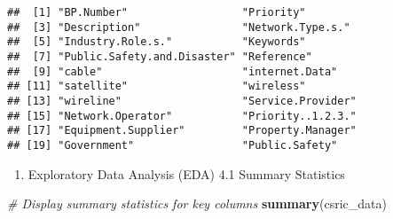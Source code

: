 \documentclass[
]{article}
\newenvironment{Shaded}{\begin{snugshade}}{\end{snugshade}}
\newcommand{\CommentTok}[1]{\textcolor[rgb]{0.56,0.35,0.01}{\textit{#1}}}
\newcommand{\FunctionTok}[1]{\textcolor[rgb]{0.13,0.29,0.53}{\textbf{#1}}}
\newcommand{\NormalTok}[1]{#1}
\newcommand{\OtherTok}[1]{\textcolor[rgb]{0.56,0.35,0.01}{#1}}
\newcommand{\SpecialCharTok}[1]{\textcolor[rgb]{0.81,0.36,0.00}{\textbf{#1}}}
\providecommand{\tightlist}{%
  \setlength{\itemsep}{0pt}\setlength{\parskip}{0pt}}
\begin{document}
\begin{verbatim}
##  [1] "BP.Number"                  "Priority"                  
##  [3] "Description"                "Network.Type.s."           
##  [5] "Industry.Role.s."           "Keywords"                  
##  [7] "Public.Safety.and.Disaster" "Reference"                 
##  [9] "cable"                      "internet.Data"             
## [11] "satellite"                  "wireless"                  
## [13] "wireline"                   "Service.Provider"          
## [15] "Network.Operator"           "Priority..1.2.3."          
## [17] "Equipment.Supplier"         "Property.Manager"          
## [19] "Government"                 "Public.Safety"
\end{verbatim}

\begin{Shaded}
\end{Shaded}

\begin{enumerate}
\def\labelenumi{\arabic{enumi}.}
\setcounter{enumi}{3}
\tightlist
\item
  Exploratory Data Analysis (EDA) 4.1 Summary Statistics
\end{enumerate}

\begin{Shaded}
\begin{Highlighting}[]
\CommentTok{\# Display summary statistics for key columns}
\FunctionTok{summary}\NormalTok{(csric\_data)}
\end{Highlighting}
\end{Shaded}
\end{document}
